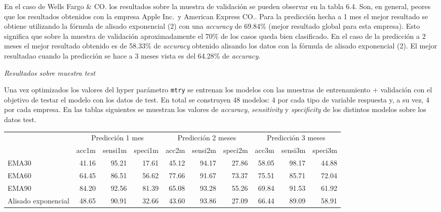 \documentclass[]{DissertateUSU}
\begin{document}
\setlength\parskip{5ex}

\noindent En el caso de Wells Fargo \& CO. los resultados sobre la
muestra de validación se pueden observar en la tabla 6.4. Son, en
general, peores que los resultados obtenidos con la empresa Apple Inc.~y
American Express CO.. Para la predicción hecha a 1 mes el mejor
resultado se obtiene utilizando la fórmula de alisado exponencial (2)
con una \emph{accuracy} de 69.84\% (mejor resultado global para esta
empresa). Esto significa que sobre la muestra de validación
aproximadamente el 70\% de los casos queda bien clasificado. En el caso
de la predicción a 2 meses el mejor resultado obtenido es de 58.33\% de
\emph{accuracy} obtenido alisando los datos con la fórmula de alisado
exponencial (2). El mejor resultadao cuando la predicción se hace a 3
meses vista es del 64.28\% de \emph{accuracy}.

\emph{Resultados sobre muestra test}

\noindent Una vez optimizados los valores del hyper parámetro
\texttt{mtry} se entrenan los modelos con las muestras de entrenamiento
+ validación con el objetivo de testar el modelo con los datos de test.
En total se construyen 48 modelos: 4 por cada tipo de variable respuesta
y, a su vez, 4 por cada empresa. En las tablas siguientes se muestran
los valores de \emph{accuracy}, \emph{sensitivity} y \emph{specificity}
de los distintos modelos sobre los datos test.

\begin{table}[H]
\centering\begingroup\fontsize{10}{12}\selectfont

\begin{tabular}{l|r|r|r|r|r|r|r|r|r}
\hline
\multicolumn{1}{c|}{ } & \multicolumn{3}{c|}{Predicción 1 mes} & \multicolumn{3}{c|}{Predicción 2 meses} & \multicolumn{3}{c}{Predicción 3 meses} \\
\cline{2-4} \cline{5-7} \cline{8-10}
  & acc1m & sensi1m & speci1m & acc2m & sensi2m & speci2m & acc3m & sensi3m & speci3m\\
\hline
EMA30 & 41.16 & 95.21 & 17.61 & 45.12 & 94.17 & 27.86 & 58.05 & 98.17 & 44.88\\
\hline
EMA60 & 64.45 & 86.51 & 56.62 & 77.66 & 91.67 & 73.37 & 75.51 & 85.71 & 72.04\\
\hline
EMA90 & 84.20 & 92.56 & 81.39 & 65.08 & 93.28 & 55.26 & 69.84 & 91.53 & 61.92\\
\hline
Alisado exponencial & 48.65 & 90.91 & 32.66 & 43.60 & 93.86 & 27.09 & 66.44 & 89.09 & 58.91\\
\hline
\end{tabular}
\endgroup{}
\end{table}
\end{document}
